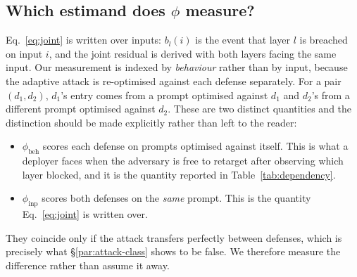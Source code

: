 %
%

\subsection{Which estimand does \texorpdfstring{$\phi$}{phi} measure?}
\label{sec:estimand}

Eq.~\eqref{eq:joint} is written over inputs: $b_l(i)$ is the event that layer $l$ is breached
on input $i$, and the joint residual is derived with both layers facing the same input. Our
measurement is indexed by \emph{behaviour} rather than by input, because the adaptive attack
is re-optimised against each defense separately. For a pair $(d_1,d_2)$, $d_1$'s entry comes
from a prompt optimised against $d_1$ and $d_2$'s from a different prompt optimised against
$d_2$. These are two distinct quantities and the distinction should be made explicitly rather
than left to the reader:

\begin{itemize}
\item $\phi_{\mathrm{beh}}$ scores each defense on prompts optimised against itself. This is
what a deployer faces when the adversary is free to retarget after observing which layer
blocked, and it is the quantity reported in Table~\ref{tab:dependency}.
\item $\phi_{\mathrm{inp}}$ scores both defenses on the \emph{same} prompt. This is the
quantity Eq.~\eqref{eq:joint} is written over.
\end{itemize}

They coincide only if the attack transfers perfectly between defenses, which is precisely
what \S\ref{par:attack-class} shows to be false. We therefore measure the difference rather
than assume it away.

